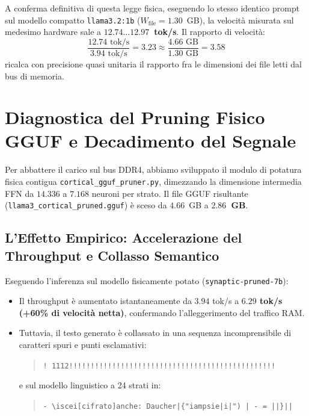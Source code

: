 \documentclass[10pt,a4paper]{article}
\theoremstyle{definition}
\begin{document}
\noindent A conferma definitiva di questa legge fisica, eseguendo lo stesso identico prompt sul modello compatto \texttt{llama3.2:1b} ($W_{\text{file}} = 1.30$~GB), la velocità misurata sul medesimo hardware sale a \textbf{$12.74 \dots 12.97$~tok/s}. Il rapporto di velocità:
\begin{equation}
\frac{12.74 \text{ tok/s}}{3.94 \text{ tok/s}} = 3.23 \approx \frac{4.66 \text{ GB}}{1.30 \text{ GB}} = 3.58
\end{equation}
ricalca con precisione quasi unitaria il rapporto fra le dimensioni dei file letti dal bus di memoria.

\bigskip

\section{Diagnostica del Pruning Fisico GGUF e Decadimento del Segnale}

Per abbattere il carico sul bus DDR4, abbiamo sviluppato il modulo di potatura fisica contigua \texttt{cortical\_gguf\_pruner.py}, dimezzando la dimensione intermedia FFN da $14.336$ a $7.168$ neuroni per strato. Il file GGUF risultante (\texttt{llama3\_cortical\_pruned.gguf}) è sceso da $4.66$~GB a \textbf{$2.86$~GB}.

\subsection{L'Effetto Empirico: Accelerazione del Throughput e Collasso Semantico}
Eseguendo l'inferenza sul modello fisicamente potato (\texttt{synaptic-pruned-7b}):
\begin{itemize}[leftmargin=1.5em]
    \item Il throughput è aumentato istantaneamente da $3.94$ tok/s a \textbf{$6.29$ tok/s (+60\% di velocità netta)}, confermando l'alleggerimento del traffico RAM.
    \item Tuttavia, il testo generato è collassato in una sequenza incomprensibile di caratteri spuri e punti esclamativi:
    \begin{quote}
    \texttt{! 1112!!!!!!!!!!!!!!!!!!!!!!!!!!!!!!!!!!!!!!!!!!!!!!!!}
    \end{quote}
    e sul modello linguistico a 24 strati in:
    \begin{quote}
    \texttt{- \textbackslash iscei[cifrato]anche: Daucher|\{"iampsie|i|") | - = ||\}||}
    \end{quote}
\end{itemize}
\end{document}
